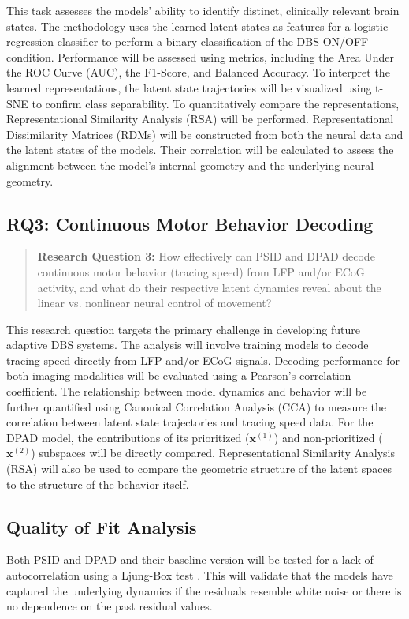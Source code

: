 \documentclass[12pt, letterpaper]{article}
\begin{document}
This task assesses the models' ability to identify distinct, clinically relevant brain states. The methodology uses the learned latent states as features for a logistic regression classifier to perform a binary classification of the DBS ON/OFF condition. Performance will be assessed using metrics, including the Area Under the ROC Curve (AUC), the F1-Score, and Balanced Accuracy. To interpret the learned representations, the latent state trajectories will be visualized using t-SNE to confirm class separability. To quantitatively compare the representations, Representational Similarity Analysis (RSA) will be performed. Representational Dissimilarity Matrices (RDMs) will be constructed from both the neural data and the latent states of the models. Their correlation will be calculated to assess the alignment between the model's internal geometry and the underlying neural geometry.


\subsection{RQ3: Continuous Motor Behavior Decoding}
\begin{quote}
    \textbf{Research Question 3:} How effectively can PSID and DPAD decode continuous motor behavior (tracing speed) from LFP and/or ECoG activity, and what do their respective latent dynamics reveal about the linear vs. nonlinear neural control of movement?
\end{quote}

This research question targets the primary challenge in developing future adaptive DBS systems. The analysis will involve training models to decode tracing speed directly from LFP and/or ECoG signals. Decoding performance for both imaging modalities will be evaluated using a Pearson's correlation coefficient. The relationship between model dynamics and behavior will be further quantified using Canonical Correlation Analysis (CCA) to measure the correlation between latent state trajectories and tracing speed data. For the DPAD model, the contributions of its prioritized ($\mathbf{x}^{(1)}$) and non-prioritized ($\mathbf{x}^{(2)}$) subspaces will be directly compared. Representational Similarity Analysis (RSA) will also be used to compare the geometric structure of the latent spaces to the structure of the behavior itself.

\subsection{Quality of Fit Analysis}
Both PSID and DPAD and their baseline version will be tested for a lack of autocorrelation using a Ljung-Box test \parencite{ljungMeasureLackFit1978}. This will validate that the models have captured the underlying dynamics if the residuals resemble white noise or there is no dependence on the past residual values.
\end{document}
